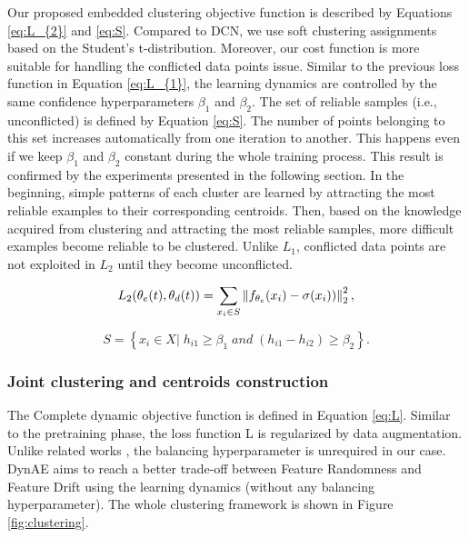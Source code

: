\documentclass{article}
\begin{document}
Our proposed embedded clustering objective function is described by Equations \ref{eq:L_{2}} and \ref{eq:S}.  Compared to DCN, we use soft clustering assignments based on the Student’s t-distribution. Moreover, our cost function is more suitable for handling the conflicted data points issue. Similar to the previous loss function in Equation \ref{eq:L_{1}}, the learning dynamics are controlled by the same confidence hyperparameters $\beta_{1}$ and $\beta_{2}$. The set of reliable samples (i.e., unconflicted) is defined by Equation \ref{eq:S}. The number of points belonging to this set increases automatically from one iteration to another. This happens even if we keep  $\beta_{1}$ and $\beta_{2}$ constant during the whole training process. This result is confirmed by the experiments presented in the following section. In the beginning, simple patterns of each cluster are learned by attracting the most reliable examples to their corresponding centroids. Then, based on the knowledge acquired from clustering and attracting the most reliable samples, more difficult examples become reliable to be clustered. Unlike $L_{1}$, conflicted data points are not exploited in $L_{2}$ until they become unconflicted. 

\begin{equation} \label{eq:L_{2}}
    L_{2}(\theta_{e}(t), \theta_{d}(t)) = \sum_{x_{i}\in S} \left \| f_{\theta_{e}}(x_{i})- \sigma(x_{i})) \right \|_{2}^{2},
\end{equation}

\begin{equation}\label{eq:S}
    S=\left \{ x_{i} \in X | \; h_{i1} \geq  \beta_{1} \; and \;  (h_{i1}-h_{i2}) \geq   \beta_{2}  \right \}. 
\end{equation}

\subsubsection{Joint clustering and centroids construction}

The Complete dynamic objective function is defined in Equation \ref{eq:L}. Similar to the pretraining phase, the loss function L is regularized by data augmentation. Unlike related works \cite{paper27, paper28, paper29, paper36}, the balancing hyperparameter is unrequired in our case. DynAE aims to reach a better trade-off between Feature Randomness and Feature Drift using the learning dynamics (without any balancing hyperparameter). The whole clustering framework is shown in Figure \ref{fig:clustering}.
\end{document}
